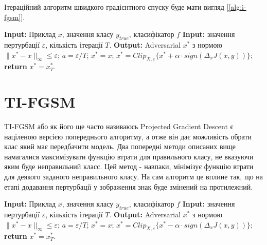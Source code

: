 \documentclass[a4paper,12pt]{extreport}
\renewcommand{\algorithmicrequire}{\textbf{Input: }}
\renewcommand{\algorithmicensure}{\textbf{Output: }}
\newcommand{\algorithmreturn}{\textbf{return }}
\begin{document}
	Ітераційний алгоритм швидкого градієнтного спуску буде мати вигляд [\ref{alg:i-fgsm}].
	
	\begin{algorithm}
		\caption{$I-FGSM$}
		\label{alg:i-fgsm}
		\begin{algorithmic}[1]
			\State \algorithmicrequire{Приклад $x$, значення класу $y_{true}$, класифікатор $f$}
			\State \algorithmicrequire{значення пертурбації $\varepsilon$, кількість ітерації $T$.}
			\State \algorithmicensure{ Adversarial $x^{*}$ з нормою $\|x^{*} - x\|_{\infty} \leq \varepsilon $;}
			\State $a = \varepsilon / T $;
			\State $x^{*} = x$;
			\State $x^{*} = Clip_{X, \varepsilon} \big\{ x^{*} + \alpha \cdot  sign(\Delta_x J(x, y)) \big\}$;
			\EndFor
			\State \algorithmreturn{$x^{*} = x^{*}_{T}$}.
		\end{algorithmic}
	\end{algorithm}
		
	\newpage
	\section{TI-FGSM}
	TI-FGSM або як його ще часто називаюсь Projected Gradient Descent є націленою версією попереднього алгоритму, а отже він дає можливість обрати клас який має передбачити модель. Два попередні методи описаних вище намагалися максимізувати функцію втрати для правильного класу, не вказуючи яким буде неправильний класс. Цей метод - навпаки, мінімізує функцію втрати для деякого заданого неправильного класу. На сам алгоритм це вплине так, що на етапі додавання пертурбації у зображення знак буде змінений на протилежний.

	\begin{algorithm}
		\caption{$TI-FGSM$}
		\label{alg:ti-fgsm}
		\begin{algorithmic}[1]
			\State \algorithmicrequire{Приклад $x$, значення класу $y_{true}$, класифікатор $f$}
			\State \algorithmicrequire{значення пертурбації $\varepsilon$, кількість ітерації $T$.}
			\State \algorithmicensure{ Adversarial $x^{*}$ з нормою $\|x^{*} - x\|_{\infty} \leq \varepsilon $;}
			\State $a = \varepsilon / T $;
			\State $x^{*} = x$;
			\For{$t=0 \; to \; T-1$}
			\State $x^{*} = Clip_{X, \varepsilon} \big\{ x^{*} - \alpha \cdot  sign(\Delta_x J(x, y)) \big\}$;
			\EndFor
			\State \algorithmreturn{$x^{*} = x^{*}_{T}$}.
		\end{algorithmic}
	\end{algorithm}
\end{document}
